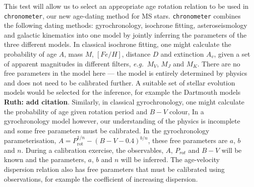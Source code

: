 \documentclass[12pt]{article}
\newcommand{\av}{$A_v$}
\newcommand{\eg}{{\it e.g.}}
\newcommand{\feh}{$[Fe/H]$}
\begin{document}
This test will allow us to select an appropriate age rotation relation to be
used in {\tt chronometer}, our new age-dating method for MS stars.
{\tt chronometer} combines the following dating methods: gyrochronology,
isochrone fitting, asteroseismology and galactic kinematics into one model by
jointly inferring the parameters of the three different models.
In classical isochrone fitting, one might calculate the probability of age
$A$, mass $M$, \feh, distance $D$ and extinction \av, given a set of
apparent magnitudes in different filters, \eg\ $M_V$, $M_J$ and $M_K$.
There are no free parameters in the model here --- the model is entirely
determined by physics and does not need to be calibrated further.
A suitable set of stellar evolution models would be selected for the
inference, for example the Dartmouth models
{\bf Ruth: add citation}.
Similarly, in classical gyrochronology, one might calculate the probability of
age given rotation period and $B-V$ colour,
In a gyrochronology model however, our understanding of the physics is
incomplete and some free parameters must be calibrated.
In the \citet{barnes2003} gyrochronology parameterisation, $A =
P_{\mathrm{rot}}^{1/n} - (B-V-0.4)^{b/n}$, these free parameters are $a$, $b$
and $n$.
During a calibration exercise, the observables, $A$, $P_{rot}$ and $B-V$ will
be known and the parameters, $a$, $b$ and $n$ will be inferred.
The age-velocity dispersion relation also has free parameters that must be
calibrated using observations, for example the coefficient of increasing
dispersion.
\end{document}

